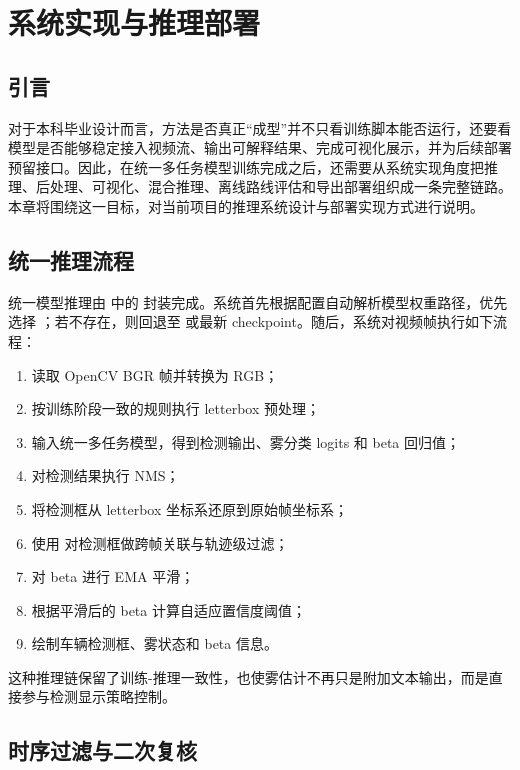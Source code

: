 \chapter{系统实现与推理部署}

\section{引言}

对于本科毕业设计而言，方法是否真正“成型”并不只看训练脚本能否运行，还要看模型是否能够稳定接入视频流、输出可解释结果、完成可视化展示，并为后续部署预留接口。因此，在统一多任务模型训练完成之后，还需要从系统实现角度把推理、后处理、可视化、混合推理、离线路线评估和导出部署组织成一条完整链路。本章将围绕这一目标，对当前项目的推理系统设计与部署实现方式进行说明。

\section{统一推理流程}

统一模型推理由  中的  封装完成。系统首先根据配置自动解析模型权重路径，优先选择 ；若不存在，则回退至  或最新 checkpoint。随后，系统对视频帧执行如下流程：

\begin{enumerate}[leftmargin=2.5em]
\item 读取 OpenCV BGR 帧并转换为 RGB；
\item 按训练阶段一致的规则执行 letterbox 预处理；
\item 输入统一多任务模型，得到检测输出、雾分类 logits 和 beta 回归值；
\item 对检测结果执行 NMS；
\item 将检测框从 letterbox 坐标系还原到原始帧坐标系；
\item 使用  对检测框做跨帧关联与轨迹级过滤；
\item 对 beta 进行 EMA 平滑；
\item 根据平滑后的 beta 计算自适应置信度阈值；
\item 绘制车辆检测框、雾状态和 beta 信息。
\end{enumerate}

这种推理链保留了训练-推理一致性，也使雾估计不再只是附加文本输出，而是直接参与检测显示策略控制。

\section{时序过滤与二次复核}

